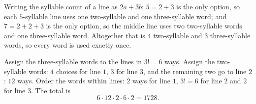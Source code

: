 Writing the syllable count of a line as $2a+3b$: $5=2+3$ is the only option, so each $5$-syllable line uses one two-syllable and one three-syllable word; and $7=2+2+3$ is the only option, so the middle line uses two two-syllable words and one three-syllable word. Altogether that is $4$ two-syllable and $3$ three-syllable words, so every word is used exactly once.

Assign the three-syllable words to the lines in $3!=6$ ways. Assign the two-syllable words: $4$ choices for line $1$, $3$ for line $3$, and the remaining two go to line $2$: $12$ ways. Order the words within lines: $2$ ways for line $1$, $3!=6$ for line $2$ and $2$ for line $3$. The total is
\[6\cdot12\cdot2\cdot6\cdot2=\boxed{1728}.\]
